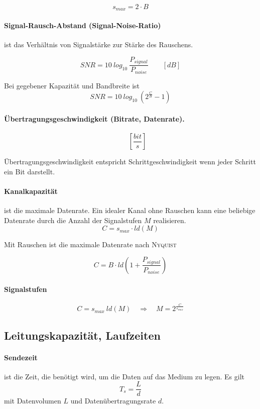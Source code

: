 \documentclass[]{scrartcl}
\begin{document}
$$s_{max} = 2 \cdot B$$


\paragraph{Signal-Rausch-Abstand (Signal-Noise-Ratio)} ist das Verh\"altnis von Signalst\"arke zur St\"arke des Rauschens.

$$ SNR =  10 \ log_{10} \ \frac{P_{signal}}{P_{noise}} \qquad [dB]$$

Bei gegebener Kapazit\"at und Bandbreite ist 
$$SNR = 10 \ log_{10} \ ( 2^ \frac{C}{B} - 1)$$


\paragraph{\"Ubertragungsgeschwindigkeit (Bitrate, Datenrate). }

$$ \qquad [\frac{bit}{s}]$$

\"Ubertragungsgeschwindigkeit entspricht Schrittgeschwindigkeit wenn jeder Schritt ein Bit darstellt.


\paragraph{Kanalkapazit\"at } ist die maximale Datenrate.
Ein idealer Kanal ohne Rauschen kann eine beliebige Datenrate durch die Anzahl der Signalstufen $M$ realisieren.
$$C = s_{max} \cdot ld(M)$$

Mit Rauschen ist die maximale Datenrate nach \textsc{Nyquist}

$$C = B \cdot ld(1 + \frac{P_{signal}}{P_{noise}})  $$


\paragraph{Signalstufen}

$$C = s_{max} \ ld(M) \quad \Rightarrow \quad M = 2^{\frac{C}{s_{max}}}$$


\subsection{Leitungskapazit\"at, Laufzeiten}

\paragraph{Sendezeit} ist die Zeit, die ben\"otigt wird, um die Daten auf das Medium zu legen. Es gilt 
$$T_{s} = \frac{L}{d}$$
mit Datenvolumen $L$ und Daten\"ubertragungsrate $d$.
\end{document}
